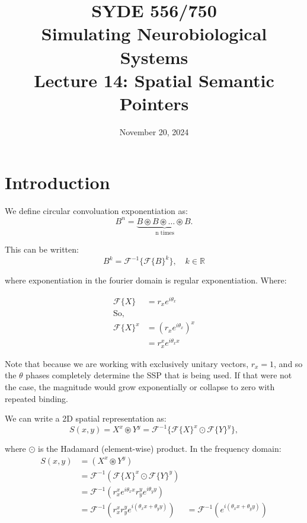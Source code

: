 \documentclass[10pt,letterpaper,oneside]{article}
\date{November 20, 2024}
\title{SYDE 556/750 \\ Simulating Neurobiological Systems \\ Lecture 14: Spatial Semantic Pointers}
\begin{document}

\section{Introduction}


We define circular convoluation exponentiation as: 
\begin{equation}
  B^n = \underbrace{B \circledast B \circledast \dots \circledast B. }_{\text{n times}}
\end{equation}

This can be written: 
\begin{equation}
  B^k = \mathcal{F}^{-1}\{\mathcal{F}\{B\}^k\}, \quad k \in \mathbb{R}
\end{equation}

where exponentiation in the fourier domain is regular exponentiation.  Where: 

\begin{align}
  \mathcal{F}\{ X\} &= r_{x} e^{i \theta_{x}} \\
  \textrm{So,}\\
  \mathcal{F}\{ X\}^x &= \left( r_{x} e^{i \theta_{x}} \right)^x \\
  &= r_{x}^x e^{i \theta_{x} x} 
\end{align}

Note that because we are working with exclusively unitary vectors, $r_x = 1$, and so the $\theta$ phases completely determine the SSP that is being used. If that were not the case, the magnitude would grow exponentially or collapse to zero with repeated binding.

We can write a 2D spatial representation as: 
\begin{equation}
  S(x,y) = X^x \circledast Y^y = \mathcal{F}^{-1}\{\mathcal{F}\{X\}^x\odot\mathcal{F} \{Y\}^y\},
\end{equation}

where $\odot$ is the Hadamard (element-wise) product. In the frequency domain: 
\begin{align}
  S(x, y) &= (X^{x} \circledast Y^{y}) \\
   &= \mathcal{F}^{-1}( \mathcal{F}\{ X\}^{x} \odot \mathcal{F}\{ Y\}^{y} ) \\
   &=  \mathcal{F}^{-1}(r_{x}^x e^{ i \theta_{x} x} r_{y}^y  e^{i \theta_{y} y })\\
   &=  \mathcal{F}^{-1}(r_{x}^x r_{y}^y e^{ i(\theta_{x} x + \theta_{y} y )})
   &=  \mathcal{F}^{-1}(e^{ i(\theta_{x} x + \theta_{y} y )})
\end{align}
\end{document}

